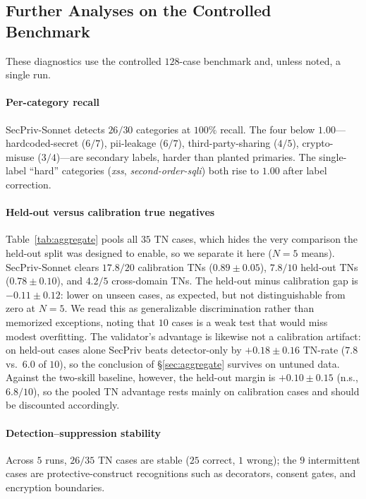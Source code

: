 \documentclass[runningheads]{llncs}
\begin{document}
\subsection{Further Analyses on the Controlled Benchmark}\label{sec:further}

These diagnostics use the controlled $128$-case benchmark and, unless noted, a single run.

\paragraph{Per-category recall}\label{sec:percat} SecPriv-Sonnet detects $26/30$ categories at $100\%$ recall. The four below $1.00$---hardcoded-secret ($6/7$), pii-leakage ($6/7$), third-party-sharing ($4/5$), crypto-misuse ($3/4$)---are secondary labels, harder than planted primaries. The single-label ``hard'' categories (\emph{xss}, \emph{second-order-sqli}) both rise to $1.00$ after label correction.

\paragraph{Held-out versus calibration true negatives}\label{sec:holdout} Table~\ref{tab:aggregate} pools all $35$ TN cases, which hides the very comparison the held-out split was designed to enable, so we separate it here ($N{=}5$ means). SecPriv-Sonnet clears $17.8/20$ calibration TNs ($0.89 \pm 0.05$), $7.8/10$ held-out TNs ($0.78 \pm 0.10$), and $4.2/5$ cross-domain TNs. The held-out minus calibration gap is $-0.11 \pm 0.12$: lower on unseen cases, as expected, but not distinguishable from zero at $N{=}5$. We read this as generalizable discrimination rather than memorized exceptions, noting that $10$ cases is a weak test that would miss modest overfitting. The validator's advantage is likewise not a calibration artifact: on held-out cases alone SecPriv beats detector-only by $+0.18 \pm 0.16$ TN-rate ($7.8$ vs.\ $6.0$ of $10$), so the conclusion of \S\ref{sec:aggregate} survives on untuned data. Against the two-skill baseline, however, the held-out margin is $+0.10 \pm 0.15$ (n.s., $6.8/10$), so the pooled TN advantage rests mainly on calibration cases and should be discounted accordingly.

\paragraph{Detection--suppression stability} Across $5$ runs, $26/35$ TN cases are stable ($25$ correct, $1$ wrong); the $9$ intermittent cases are protective-construct recognitions such as decorators, consent gates, and encryption boundaries.
\end{document}
